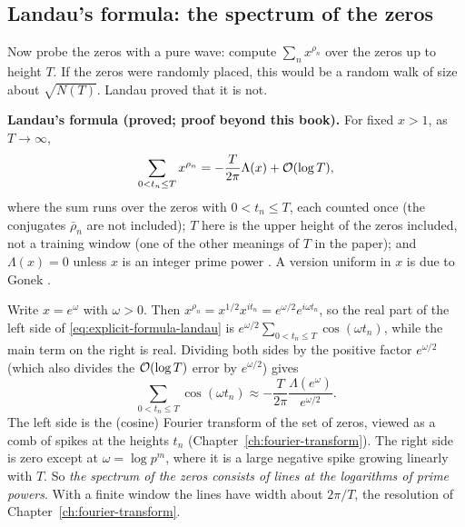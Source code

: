 \subsection{Landau's formula: the spectrum of the zeros}

Now probe the zeros with a pure wave: compute $\sum_n x^{\rho_n}$ over the zeros up to height $T$. If the zeros were randomly placed, this would be a random walk of size about $\sqrt{N(T)}$. Landau proved that it is not.

\begin{beyond}
\textbf{Landau's formula (proved; proof beyond this book).} For fixed $x>1$, as $T\to\infty$,
\begin{equation}
\sum_{0<t_n\le T}x^{\rho_n}=-\frac{T}{2\pi}\Lambda(x)+\mathcal{O}(\log T),
\label{eq:explicit-formula-landau}
\end{equation}
where the sum runs over the zeros with $0<t_n\le T$, each counted once (the conjugates $\bar\rho_n$ are not included); $T$ here is the upper height of the zeros included, not a training window (one of the other meanings of $T$ in the paper); and $\Lambda(x)=0$ unless $x$ is an integer prime power \cite{landau}. A version uniform in $x$ is due to Gonek \cite{gonek}.
\end{beyond}

Write $x=e^{\omega}$ with $\omega>0$. Then $x^{\rho_n}=x^{1/2}x^{it_n}=e^{\omega/2}e^{i\omega t_n}$, so the real part of the left side of \cref{eq:explicit-formula-landau} is $e^{\omega/2}\sum_{0<t_n\le T}\cos(\omega t_n)$, while the main term on the right is real. Dividing both sides by the positive factor $e^{\omega/2}$ (which also divides the $\mathcal{O}(\log T)$ error by $e^{\omega/2}$) gives
\begin{equation}
\sum_{0<t_n\le T}\cos(\omega t_n)\approx-\frac{T}{2\pi}\frac{\Lambda(e^{\omega})}{e^{\omega/2}}.
\label{eq:explicit-formula-landaucos}
\end{equation}
The left side is the (cosine) Fourier transform of the set of zeros, viewed as a comb of spikes at the heights $t_n$ (Chapter~\ref{ch:fourier-transform}). The right side is zero except at $\omega=\log p^m$, where it is a large negative spike growing linearly with $T$. So \emph{the spectrum of the zeros consists of lines at the logarithms of prime powers}. With a finite window the lines have width about $2\pi/T$, the resolution of Chapter~\ref{ch:fourier-transform}.

